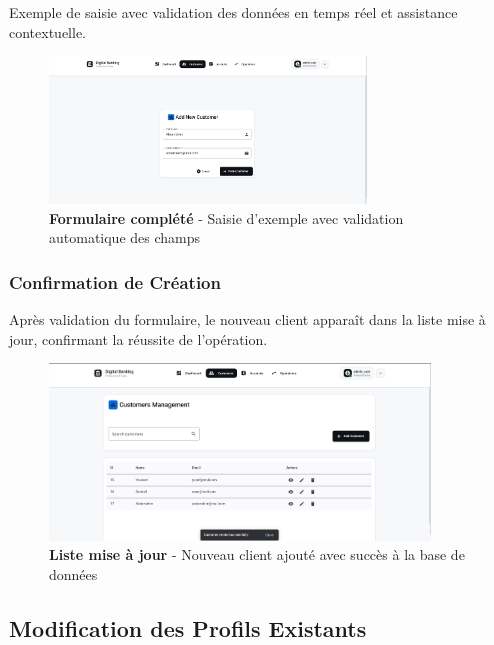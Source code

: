 \documentclass[11pt, a4paper]{article}
\begin{document}
Exemple de saisie avec validation des données en temps réel et assistance contextuelle.

\begin{figure}[H]
    \centering
    \includegraphics[width=0.75\textwidth]{screenshots/04_03_customer_form_new_filled.png}
    \caption{\textbf{Formulaire complété} - Saisie d'exemple avec validation automatique des champs}
    \label{fig:customer_form_new_filled}
\end{figure}

\subsubsection{Confirmation de Création}

Après validation du formulaire, le nouveau client apparaît dans la liste mise à jour, confirmant la réussite de l'opération.

\begin{figure}[H]
    \centering
    \includegraphics[width=0.9\textwidth]{screenshots/04_04_customer_list_after_creation.png}
    \caption{\textbf{Liste mise à jour} - Nouveau client ajouté avec succès à la base de données}
    \label{fig:customer_list_after_creation}
\end{figure}

\subsection{Modification des Profils Existants}
\end{document}
